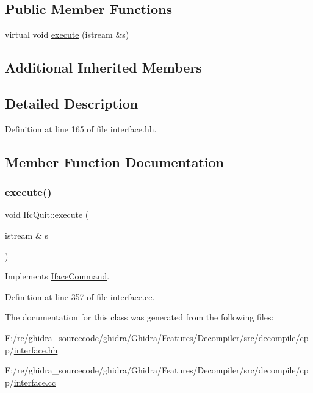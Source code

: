 \subsection*{Public Member Functions}
\begin{DoxyCompactItemize}
\item 
virtual void \mbox{\hyperlink{class_ifc_quit_a654a95f381fca497695ed65ad8896436}{execute}} (istream \&s)
\end{DoxyCompactItemize}
\subsection*{Additional Inherited Members}


\subsection{Detailed Description}


Definition at line 165 of file interface.\+hh.



\subsection{Member Function Documentation}
\mbox{\label{class_ifc_quit_a654a95f381fca497695ed65ad8896436}} 
\subsubsection{\texorpdfstring{execute()}{execute()}}
{\footnotesize\ttfamily void Ifc\+Quit\+::execute (\begin{DoxyParamCaption}\item[{istream \&}]{s }\end{DoxyParamCaption})\hspace{0.3cm}{\ttfamily [virtual]}}



Implements \mbox{\hyperlink{class_iface_command_af10e29cee2c8e419de6efe9e680ad201}{Iface\+Command}}.



Definition at line 357 of file interface.\+cc.



The documentation for this class was generated from the following files\+:\begin{DoxyCompactItemize}
\item 
F\+:/re/ghidra\+\_\+sourcecode/ghidra/\+Ghidra/\+Features/\+Decompiler/src/decompile/cpp/\mbox{\hyperlink{interface_8hh}{interface.\+hh}}\item 
F\+:/re/ghidra\+\_\+sourcecode/ghidra/\+Ghidra/\+Features/\+Decompiler/src/decompile/cpp/\mbox{\hyperlink{interface_8cc}{interface.\+cc}}\end{DoxyCompactItemize}
